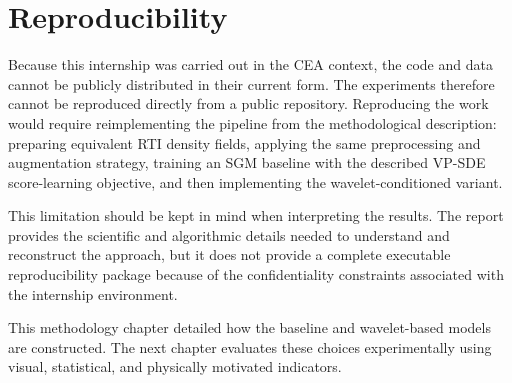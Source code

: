 \section{Reproducibility}

Because this internship was carried out in the CEA context, the code and data
cannot be publicly distributed in their current form. The experiments therefore
cannot be reproduced directly from a public repository. Reproducing the work
would require reimplementing the pipeline from the methodological description:
preparing equivalent RTI density fields, applying the same preprocessing and
augmentation strategy, training an SGM baseline with the described VP-SDE
score-learning objective, and then implementing the wavelet-conditioned
variant.

This limitation should be kept in mind when interpreting the results. The
report provides the scientific and algorithmic details needed to understand and
reconstruct the approach, but it does not provide a complete executable
reproducibility package because of the confidentiality constraints associated
with the internship environment.

This methodology chapter detailed how the baseline and wavelet-based models are constructed. The next chapter evaluates these choices experimentally using visual, statistical, and physically motivated indicators.
